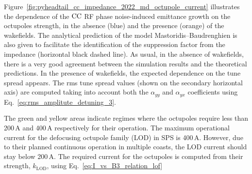 Figure~\ref{fig:pyheadtail_cc_impedance_2022_md_octupole_current} illustrates the dependence of the ${\mathrm{CC}}$ RF phase noise-induced emittance growth on the octupoles strength, in the absence (blue) and the presence (orange) of the wakefields. The analytical prediction of the model Mastoridis--Baudrenghien is also given to facilitate the identification of the suppression factor from the impedance (horizontal black dashed line). As usual, in the absence of wakefields, there is a very good agreement between the simulation results and the theoretical predictions. In the presence of wakefields, the expected dependence on the tune spread appears. The rms tune spread values (shown on the secondary horizontal axis) are computed taking into account both the $\alpha_{{yy}}$ and $\alpha_{{yx}}$ coefficients using Eq.~\eqref{eq:rms_amplitute_detuning_3}.

The green and yellow areas indicate regimes where the octupoles require less than 200\,A and 400\,A respectively for their operation. The maximum operational current for the defocusing octupole family (LOD) in SPS is 400\,A. However, due to their planned continuous operation in multiple coasts, the LOD current should stay below 200\,A. The required current for the octupoles is computed from their strength, $k_\mathrm{LOD}$, using Eq.~\eqref{eq:I_vs_B3_relation_lof}


